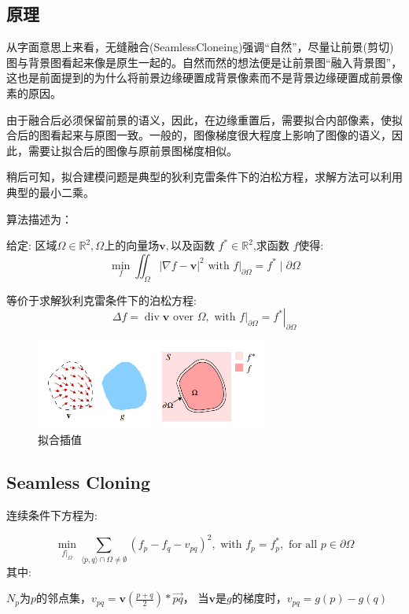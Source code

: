 \documentclass[12pt]{article}
\begin{document}
		\subsection{原理}
		从字面意思上来看，无缝融合(SeamlessCloneing)强调“自然”，尽量让前景(剪切)图与背景图看起来像是原生一起的。自然而然的想法便是让前景图“融入背景图”，这也是前面提到的为什么将前景边缘硬置成背景像素而不是背景边缘硬置成前景像素的原因。
		
		由于融合后必须保留前景的语义，因此，在边缘重置后，需要拟合内部像素，使拟合后的图看起来与原图一致。一般的，图像梯度很大程度上影响了图像的语义，因此，需要让拟合后的图像与原前景图梯度相似。
		
		稍后可知，拟合建模问题是典型的狄利克雷条件下的泊松方程，求解方法可以利用典型的最小二乘。
		
		算法描述为：
		
		给定: 区域$\Omega\in \mathbb{R}^{2}, \Omega \text{上的向量场} \mathbf{v}, \text{以及函数 } f^{*} \in \mathbb{R}^{2}$,求函数 $f$使得:
		$$
		\min _{f} \iint_{\Omega}|\nabla f-\mathbf{v}|^{2} \text { with }\left.f\right|_{\partial \Omega}=f^{*} \mid \partial \Omega
		$$
		
		等价于求解狄利克雷条件下的泊松方程:
		$$
		\Delta f=\operatorname{div} \mathbf{v} \text { over } \Omega, \text { with }\left.f\right|_{\partial \Omega}=\left.f^{*}\right|_{\partial \Omega}
		$$
		
		\begin{figure}[H]
			\centering
			\includegraphics[width=3in]{./paper1.png}
			\centering
			\caption{拟合插值}
		\end{figure}
	
		\subsection{Seamless Cloning}
		连续条件下方程为:
		
		$$
		\min _{\left.f\right|_{\Omega}} \sum_{\langle p, q\rangle \cap \Omega \neq \emptyset}\left(f_{p}-f_{q}-v_{p q}\right)^{2}, \text { with } f_{p}=f_{p}^{*}, \text { for all } p \in \partial \Omega
		$$
		其中:
		
		$N_{p}$为$p$的邻点集，$v_{p q}=\mathbf{v}\left(\frac{p+q}{2}\right) * \overrightarrow{p q}$， 当$\mathbf{v}$是$g$的梯度时，$v_{p q}=g(p)-g(q)$
		
\end{document}
